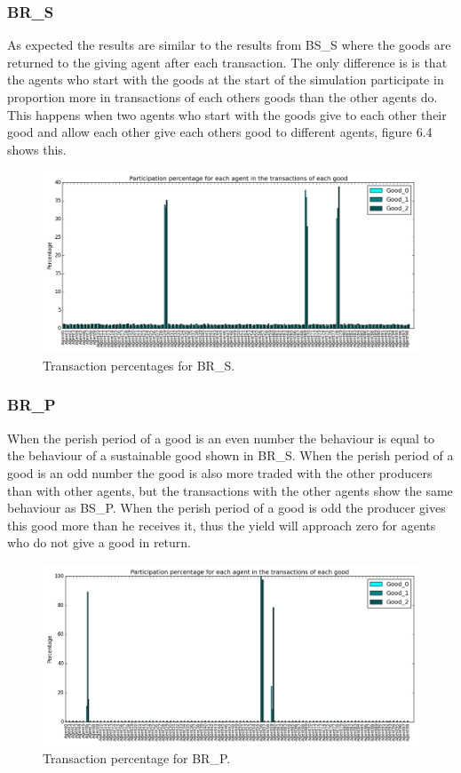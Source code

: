 \documentclass[twoside,openright]{uva-bachelor-thesis}
\begin{document}
\subsubsection{BR\_S} 
As expected the results are similar to the results from BS\_S where the goods are returned to the giving agent after each transaction. The only difference is is that the agents who start with the goods at the start of the simulation participate in proportion more in transactions of each others goods than the other agents do. This happens when two agents who start with the goods give to each other their good and allow each other give each others good to different agents, figure 6.4 shows this. \\
\begin{figure}[h!]
  \centering
    \includegraphics[scale=0.4]{Simulation_figures/BR_S/Figure1_30k}
  \caption{Transaction percentages for BR\_S.}
\end{figure}
\newpage


\subsubsection{BR\_P}
When the perish period of a good is an even number the behaviour is equal to the behaviour of a sustainable good shown in BR\_S. When the perish period of a good is an odd number the good is also more traded with the other producers than with other agents, but the transactions with the other agents show the same behaviour as BS\_P. When the perish period of a good is odd the producer gives this good more than he receives it, thus the yield will approach zero for agents who do not give a good in return.
\begin{figure}[h!]
  \centering
   \includegraphics[scale=0.4]{Simulation_figures/BR_P/Figure1_10k}
  \caption{Transaction percentage for BR\_P.}
\end{figure}
\end{document}
